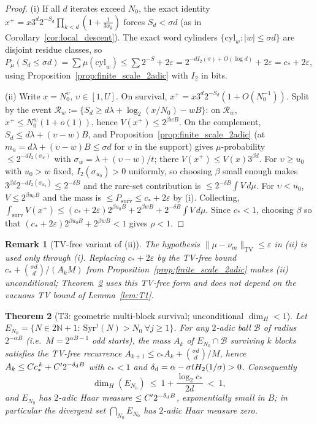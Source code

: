 \documentclass[12pt,a4paper]{article}
\newtheorem{theorem}{Theorem}[section]
\newtheorem{remark}[theorem]{Remark}
\begin{document}
\begin{proof}
(i) If all $d$ iterates exceed $N_0$, the exact identity
$x^+=x3^d2^{-S_d}\prod_{k<d}(1+\tfrac1{3x_k})$ forces
$S_d<\sigma d$ (as in Corollary~\ref{cor:local_descent}). The exact word
cylinders $\{\mathrm{cyl}_w:|w|\le\sigma d\}$ are disjoint residue classes, so
$P_\mu(S_d\le\sigma d)=\sum\mu(\mathrm{cyl}_w)\le\sum2^{-S}+2\varepsilon
=2^{-dI_2(\sigma)+O(\log d)}+2\varepsilon=c_*+2\varepsilon$,
using Proposition~\ref{prop:finite_scale_2adic} with $I_2$ in bits.

(ii) Write $x=N_0^{\upsilon}$, $\upsilon\in[1,U]$. On survival,
$x^+=x3^d2^{-S_d}(1+O(N_0^{-1}))$. Split by the event
$\mathcal R_w:=\{S_d\ge d\lambda+\log_2(x/N_0)-wB\}$: on $\mathcal R_w$,
$x^+\le N_0^{w}(1+o(1))$, hence $V(x^+)\le2^{\beta wB}$. On the complement,
$S_d\le d\lambda+(\upsilon-w)B$, and Proposition~\ref{prop:finite_scale_2adic}
(at $m_u=d\lambda+(\upsilon-w)B\le\sigma d$ for $\upsilon$ in the support) gives
$\mu$-probability $\le2^{-dI_2(\sigma_w)}$ with
$\sigma_w=\lambda+(\upsilon-w)/t$; there $V(x^+)\le V(x)3^{\beta d}$.
For $\upsilon\ge u_0$ with $u_0>w$ fixed, $I_2(\sigma_{u_0})>0$ uniformly, so
choosing $\beta$ small enough makes $3^{\beta d}2^{-dI_2(\sigma_{u_0})}\le2^{-\delta B}$
and the rare-set contribution is $\le2^{-\delta B}\int V\,d\mu$. For
$\upsilon<u_0$, $V\le2^{\beta u_0B}$ and the mass is $\le P_{\mathrm{surv}}\le c_*+2\varepsilon$
by (i). Collecting,
$\int_{\mathrm{surv}}V(x^+)\le(c_*+2\varepsilon)2^{\beta u_0B}+2^{\beta wB}+2^{-\delta B}\int V\,d\mu$.
Since $c_*<1$, choosing $\beta$ so that
$(c_*+2\varepsilon)2^{\beta u_0B}+2^{\beta wB}<1$ gives $\rho<1$.
\end{proof}

\begin{remark}[TV-free variant of (ii)]
\label{rem:T2_tvfree}
The hypothesis $\|\mu-\nu_m\|_{\mathrm{TV}}\le\varepsilon$ in (ii) is used only
through (i). Replacing $c_*+2\varepsilon$ by the TV-free bound
$c_*+\binom{\sigma d}{d}/(A_kM)$ from Proposition~\ref{prop:finite_scale_2adic}
makes (ii) unconditional; Theorem~\ref{thm:T3} uses this TV-free form and does
not depend on the vacuous TV bound of Lemma~\ref{lem:T1}.
\end{remark}

\begin{theorem}[T3: geometric multi-block survival; unconditional $\dim_H<1$]
\label{thm:T3}
Let $E_{N_0}=\{N\in2\mathbb{N}+1:\ \mathrm{Syr}^j(N)>N_0\ \forall j\ge1\}$.
For any $2$-adic ball $\mathcal B$ of radius $2^{-\alpha B}$ (i.e.\
$M=2^{\alpha B-1}$ odd starts), the mass $A_k$ of $E_{N_0}\cap\mathcal B$
surviving $k$ blocks satisfies the TV-free recurrence
$A_{k+1}\le c_*A_k+\binom{\sigma d}{d}/M$, hence
$A_k\le C c_*^{\,k}+C'2^{-\delta_{\rm d}B}$ with $c_*<1$ and
$\delta_{\rm d}=\alpha-\sigma tH_2(1/\sigma)>0$.
Consequently
\[
\dim_H(E_{N_0})\ \le\ 1+\frac{\log_2 c_*}{2d}\ <\ 1,
\]
and $E_{N_0}$ has $2$-adic Haar measure $\le C'2^{-\delta_{\rm d}B}$,
exponentially small in $B$; in particular the divergent set
$\bigcap_{N_0}E_{N_0}$ has $2$-adic Haar measure zero.
\end{theorem}
\end{document}
